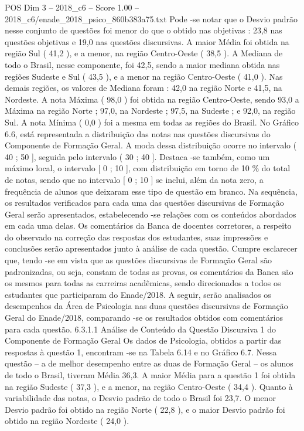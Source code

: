 \begin{textsample}{POS Dim 3 – 2018\_c6 – Score 1.00 – 2018\_c6/enade\_2018\_psico\_860b383a75.txt}
Pode -se notar que o Desvio padrão nesse conjunto de questões foi menor do que o obtido nas objetivas : 23,8 nas questões objetivas e 19,0 nas questões discursivas.
A maior Média foi obtida na região Sul ( 41,2 ), e a menor, na região Centro-Oeste ( 38,5 ).
A Mediana de todo o Brasil, nesse componente, foi 42,5, sendo a maior mediana obtida nas regiões Sudeste e Sul ( 43,5 ), e a menor na região Centro-Oeste ( 41,0 ).
Nas demais regiões, os valores de Mediana foram : 42,0 na região Norte e 41,5, na Nordeste.
A nota Máxima ( 98,0 ) foi obtida na região Centro-Oeste, sendo 93,0 a Máxima na região Norte ; 97,0, na Nordeste ; 97,5, na Sudeste ; e 92,0, na região Sul.
A nota Mínima ( 0,0 ) foi a mesma em todas as regiões do Brasil.
No Gráfico 6.6, está representada a distribuição das notas nas questões discursivas do Componente de Formação Geral.
A moda dessa distribuição ocorre no intervalo ( 40 ; 50 ], seguida pelo intervalo ( 30 ; 40 ].
Destaca -se também, como um máximo local, o intervalo [ 0 ; 10 ], com distribuição em torno de 10 \% do total de notas, sendo que no intervalo [ 0 ; 10 ] se inclui, além da nota zero, a frequência de alunos que deixaram esse tipo de questão em branco.
Na sequência, os resultados verificados para cada uma das questões discursivas de Formação Geral serão apresentados, estabelecendo -se relações com os conteúdos abordados em cada uma delas.
Os comentários da Banca de docentes corretores, a respeito do observado na correção das respostas dos estudantes, suas impressões e conclusões serão apresentados junto à análise de cada questão.
Cumpre esclarecer que, tendo -se em vista que as questões discursivas de Formação Geral são padronizadas, ou seja, constam de todas as provas, os comentários da Banca são os mesmos para todas as carreiras acadêmicas, sendo direcionados a todos os estudantes que participaram do Enade/2018.
A seguir, serão analisados os desempenhos da Área de Psicologia nas duas questões discursivas de Formação Geral do Enade/2018, comparando -se os resultados obtidos com comentários para cada questão. 6.3.1.1 Análise de Conteúdo da Questão Discursiva 1 do Componente de Formação Geral Os dados de Psicologia, obtidos a partir das respostas à questão 1, encontram -se na Tabela 6.14 e no Gráfico 6.7.
Nessa questão – a de melhor desempenho entre as duas de Formação Geral – os alunos de todo o Brasil, tiveram Média 36,3.
A maior Média para a questão 1 foi obtida na região Sudeste ( 37,3 ), e a menor, na região Centro-Oeste ( 34,4 ).
Quanto à variabilidade das notas, o Desvio padrão de todo o Brasil foi 23,7.
O menor Desvio padrão foi obtido na região Norte ( 22,8 ), e o maior Desvio padrão foi obtido na região Nordeste ( 24,0 ).

\end{textsample}
